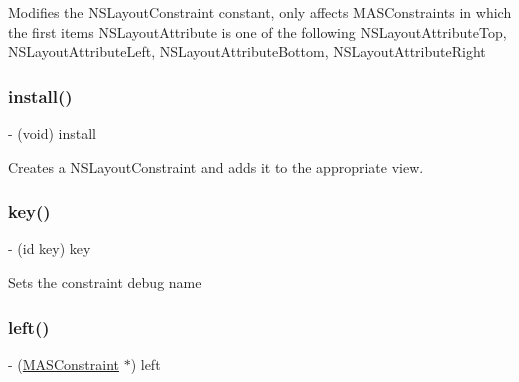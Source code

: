 Modifies the N\+S\+Layout\+Constraint constant, only affects M\+A\+S\+Constraints in which the first item\textquotesingle{}s N\+S\+Layout\+Attribute is one of the following N\+S\+Layout\+Attribute\+Top, N\+S\+Layout\+Attribute\+Left, N\+S\+Layout\+Attribute\+Bottom, N\+S\+Layout\+Attribute\+Right \mbox{\label{interface_m_a_s_constraint_a935f63500a19c58c8a4d3e79357fa837}} 
\subsubsection{\texorpdfstring{install()}{install()}}
{\footnotesize\ttfamily -\/ (void) install \begin{DoxyParamCaption}{ }\end{DoxyParamCaption}}

Creates a N\+S\+Layout\+Constraint and adds it to the appropriate view. \mbox{\label{interface_m_a_s_constraint_a101a0b38538ffb192f6bb73f68460374}} 
\subsubsection{\texorpdfstring{key()}{key()}}
{\footnotesize\ttfamily -\/ (id key) key \begin{DoxyParamCaption}{ }\end{DoxyParamCaption}}

Sets the constraint debug name \mbox{\label{interface_m_a_s_constraint_a64aa053120a64954e251f9b7d1f5d34a}} 
\subsubsection{\texorpdfstring{left()}{left()}}
{\footnotesize\ttfamily -\/ (\mbox{\hyperlink{interface_m_a_s_constraint}{M\+A\+S\+Constraint}} $\ast$) left \begin{DoxyParamCaption}{ }\end{DoxyParamCaption}}

